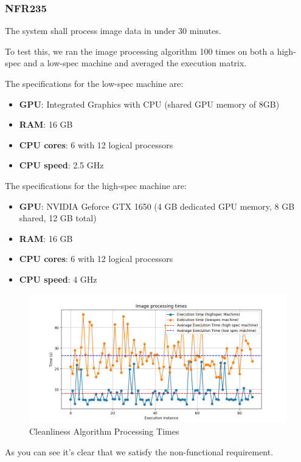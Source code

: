 \documentclass[12pt, titlepage]{article}
\begin{document}
\subsubsection{NFR235}
The system shall process image data in under 30 minutes.

To test this, we ran the image processing algorithm 100 times on both a high-spec and a low-spec machine and averaged the execution matrix.

The specifications for the low-spec machine are:
\begin{itemize}
\item \textbf{GPU}: Integrated Graphics with CPU (shared GPU memory of 8GB)
\item \textbf{RAM}: 16 GB
\item \textbf{CPU cores}: 6 with 12 logical processors
\item \textbf{CPU speed}: 2.5 GHz

\end{itemize}
The specifications for the high-spec machine are:
\begin{itemize}
\item \textbf{GPU}:  NVIDIA Geforce GTX 1650 (4 GB dedicated GPU memory, 8 GB shared, 12 GB total)
\item \textbf{RAM}: 16 GB
\item \textbf{CPU cores}: 6 with 12 logical processors
\item \textbf{CPU speed}: 4 GHz
\end{itemize}


\begin{figure}[H]
    \includegraphics[width=\linewidth]{./imgs/cleanAlgTimes.png}
    \caption{Cleanliness Algorithm Processing Times}
    \label{fig: Cleanliness Algorithm Processing Times Diagram}
\end{figure}

As you can see it's clear that we satisfy the non-functional requirement.
\end{document}

